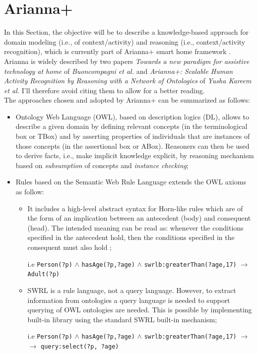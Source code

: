 \documentclass{thesisreport}
\begin{document}
 \section{Arianna+} \label{Arianna}    
 In this Section, the objective will be to describe a knowledge-based approach for domain modeling (i.e., of context/activity) and reasoning (i.e., context/activity recognition), which is currently part of Arianna+ smart home framework \cite{kareem2018arianna}. \\
 Arianna is widely described by two papers \textit{Towards a new paradigm for assistive technology at home} of \textit{Buoncompagni et al.} \cite{buoncompagni2017towards} and \textit{Arianna+: Scalable Human Activity Recognition by Reasoning with a Network of Ontologies} of \textit{Yusha Kareem et al.} \cite{kareem2018arianna} I'll therefore avoid citing them to allow for a better reading. \\
 The approaches chosen and adopted by Arianna+ can be summarized as follows:
 \begin{itemize}
     \item Ontology Web Language (OWL), based on description logics (DL), allows to describe a given domain by defining relevant concepts (in the terminological box or TBox) and by asserting properties of individuals that are instances of those concepts (in the assertional box or ABox).
     Reasoners can then be used to derive facts, i.e., make implicit knowledge explicit, by reasoning mechanism \cite{donini1994deduction} based on \textit{subsumption} of concepts and \textit{instance checking};
     \item Rules based on the Semantic Web Rule Language extends the OWL axioms as follow:
    \begin{itemize}
        \item It includes a high-level abstract syntax for Horn-like rules which are of the form of an implication between an antecedent (body) and consequent (head). The intended meaning can be read as: whenever the conditions specified in the antecedent hold, then the conditions specified in the consequent must also hold \cite{horrocks2004swrl};
        
        i.e \texttt{Person(?p)} $\wedge$ \texttt{hasAge(?p,?age)} $\wedge$ \texttt{swrlb:greaterThan(?age,17)} $\rightarrow$ \texttt{Adult(?p)}
        
        \item SWRL is a rule language, not a query language. However, to extract information from ontologies a query language is needed to support querying of OWL ontologies are needed.
        This is possible by implementing built-in library using the standard SWRL built-in mechanism; 
        
         i.e \texttt{Person(?p)} $\wedge$ \texttt{hasAge(?p,?age)} $\wedge$ \texttt{swrlb:greaterThan(?age,17)} $\rightarrow$ \\  $\rightarrow$ \texttt{query:select(?p, ?age)}
        
    \end{itemize}
 \end{itemize}
 
\end{document}
